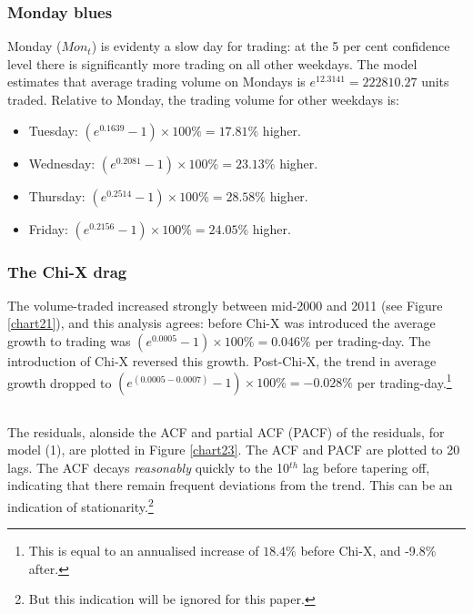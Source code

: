 \documentclass{article}
\begin{document}
\subsubsection*{Monday blues}
\vspace*{-6mm}
  Monday ($Mon_t$) is evidenty a slow day for trading: at the 5 per cent confidence level there is significantly more trading on all other weekdays. 
  The model estimates that average trading volume on Mondays is $e^{12.3141}=222810.27$ units traded. Relative to Monday, the trading volume for other weekdays is:
  \begin{itemize}
    \item Tuesday:  $(e^{0.1639}-1)\times 100\%=17.81\%$  higher.
    \item Wednesday:  $(e^{0.2081}-1)\times 100\%=23.13\%$ higher. 
    \item Thursday:  $(e^{0.2514}-1)\times 100\%=28.58\%$  higher.
    \item Friday:  $(e^{0.2156}-1)\times 100\%=24.05\%$  higher.
  \end{itemize}

\subsubsection*{The Chi-X drag}
\vspace*{-6mm}
  The volume-traded increased strongly between mid-2000 and 2011 (see Figure \ref{chart21}), and this analysis agrees: before Chi-X was introduced the average growth to trading was $(e^{0.0005}-1)\times 100\%=0.046\%$ per trading-day. The introduction of Chi-X reversed this growth. Post-Chi-X, the trend in average growth dropped to $(e^{(0.0005-0.0007)}-1)\times 100\%=-0.028\%$ per trading-day.\footnote{This is equal to an annualised increase of $18.4\%$ before Chi-X, and -9.8\% after.}


\newpage
\subsection{} \label{subsec24} %

The residuals, alonside the ACF and partial ACF (PACF) of the residuals, for model (1), are plotted in Figure \ref{chart23}. The ACF and PACF are plotted to 20 lags. The ACF decays \textit{reasonably} quickly to the 10$^{th}$ lag before tapering off, indicating that there remain frequent deviations from the trend. This can be an indication of stationarity.\footnote{But this indication will be ignored for this paper.}
\end{document}
